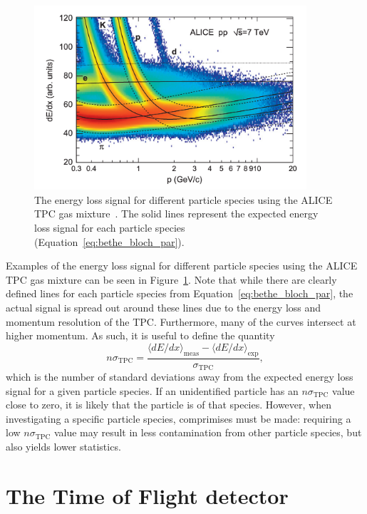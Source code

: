 \begin{figure}
    \centering
    \includegraphics[width=0.9\textwidth]{figures/experiment/tpc_pid_curves.png}
    \caption{The energy loss signal for different particle species using the ALICE TPC gas mixture~\cite{TPCPIDPlot}. The solid lines represent the expected energy loss signal for each particle species (Equation~\ref{eq:bethe_bloch_par}).}
    \label{fig:tpc_pid_curves}
\end{figure}

Examples of the energy loss signal for different particle species using the ALICE TPC gas mixture can be seen in Figure~\ref{fig:tpc_pid_curves}. Note that while there are clearly defined lines for each particle species from Equation~\ref{eq:bethe_bloch_par}, the actual signal is spread out around these lines due to the energy loss and momentum resolution of the TPC. Furthermore, many of the curves intersect at higher momentum. As such, it is useful to define the quantity 
\begin{equation}
n\sigma_{\text{TPC}} = \frac{\langle dE/dx \rangle_{\text{meas}} - \langle dE/dx \rangle_{\text{exp}}}{\sigma_{\text{TPC}}},
\end{equation}
which is the number of standard deviations away from the expected energy loss signal for a given particle species. If an unidentified particle has an $n\sigma_{\text{TPC}}$ value close to zero, it is likely that the particle is of that species. However, when investigating a specific particle species, comprimises must be made: requiring a low $n\sigma_{\text{TPC}}$ value may result in less contamination from other particle species, but also yields lower statistics.

\section{The Time of Flight detector}

